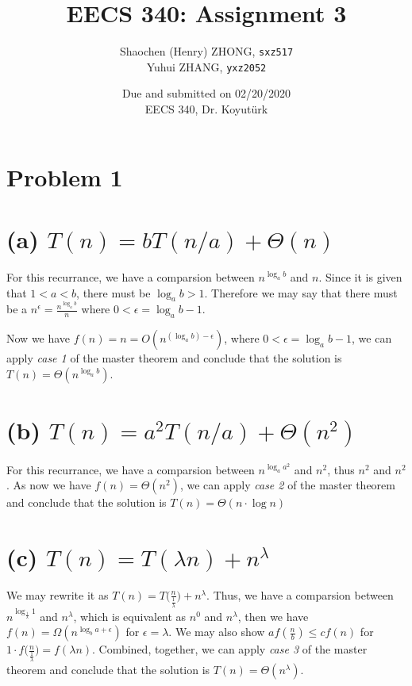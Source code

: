 \documentclass[11pt]{article}
\newcommand{\ilc}{\texttt}
\begin{document}
\title{\textbf{EECS 340: Assignment 3}}

\author{Shaochen (Henry) ZHONG, \ilc{sxz517} \\ Yuhui ZHANG, \ilc{yxz2052}}
\date{Due and submitted on 02/20/2020 \\ EECS 340, Dr. Koyut{\"u}rk}
\maketitle

\section{Problem 1}

\section{(a) $T(n) = bT(n/a) + \Theta(n)$}

For this recurrance, we have a comparsion between $n^{\log_a b}$ and $n$. Since it is given that $1 < a < b$, there must be $\log_a b > 1$. Therefore we may say that there must be a $n^\epsilon = \frac{n^{\log_a b}}{n}$ where $0 < \epsilon = \log_a b - 1$.

Now we have $f(n) = n = O(n^{(\log_a b) - \epsilon})$, where $0 < \epsilon = \log_a b - 1$, we can apply \textit{case 1} of the master theorem and conclude that the solution is $T(n) = \Theta(n^{\log_a b})$.

\section{(b) $T(n) = a^2 T(n/a) + \Theta(n^2)$}
For this recurrance, we have a comparsion between $n^{\log_a a^2}$ and $n^2$, thus $n^2$ and $n^2$. As now we have $f(n) = \Theta(n^2)$, we can apply \textit{case 2} of the master theorem and conclude that the solution is $T(n) = \Theta(n \cdot \log n)$


\section{(c) $T(n) = T(\lambda n) + n^{\lambda}$}

We may rewrite it as $T(n) = T\Big(\frac{n}{\frac{1}{\lambda}}\Big) + n^{\lambda}$. Thus, we have a comparsion between $n^{\log_{\frac{1}{\lambda}} 1}$ and $n^{\lambda}$, which is equivalent as $n^0$ and $n^{\lambda}$, then we have $f(n) = \Omega(n^{\log_b a + \epsilon})$ for $\epsilon = \lambda$. We may also show $af(\frac{n}{b}) \leq cf(n)$ for $1 \cdot f\Big(\frac{n}{\frac{1}{\lambda}}\Big) = f(\lambda n)$. Combined, together, we can apply \textit{case 3} of the master theorem and conclude that the solution is $T(n) = \Theta(n^\lambda)$.
\end{document}
